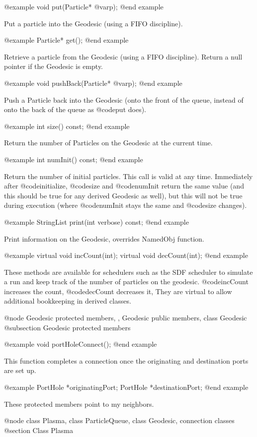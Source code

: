 @example
void put(Particle* @var{p});
@end example

Put a particle into the Geodesic (using a FIFO discipline).

@example
Particle* get();
@end example

Retrieve a particle from the Geodesic (using a FIFO discipline).
Return a null pointer if the Geodesic is empty.

@example
void pushBack(Particle* @var{p});
@end example

Push a Particle back into the Geodesic (onto the front of the queue,
instead of onto the back of the queue as @code{put} does).

@example
int size() const;
@end example

Return the number of Particles on the Geodesic at the current time.

@example
int numInit() const;
@end example

Return the number of initial particles.  This call is valid at any
time.  Immediately after @code{initialize}, @code{size} and
@code{numInit} return the same value (and this should be true for
any derived Geodesic as well), but this will not be true during
execution (where @code{numInit} stays the same and @code{size}
changes).

@example
StringList print(int verbose) const;
@end example

Print information on the Geodesic, overrides NamedObj function.

@example
virtual void incCount(int);
virtual void decCount(int);
@end example

These methods are available for schedulers such as the SDF scheduler to
simulate a run and keep track of the number of particles on the
geodesic.  @code{incCount} increases the count, @code{decCount}
decreases it, They are virtual to allow additional bookkeeping in
derived classes.

@node Geodesic protected members,  , Geodesic public members, class Geodesic
@subsection Geodesic protected members

@example
void portHoleConnect();
@end example

This function completes a connection once the originating and
destination ports are set up.

@example
PortHole *originatingPort;
PortHole *destinationPort;
@end example

These protected members point to my neighbors.

@node class Plasma, class ParticleQueue, class Geodesic, connection classes
@section Class Plasma

